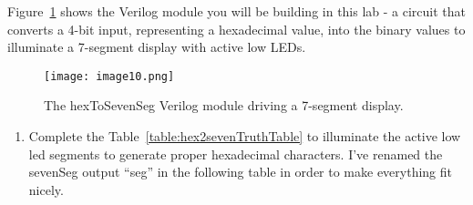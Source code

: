 Figure~\ref{fig:hex2SevenSeg} shows the Verilog module you will be building in this lab - a
circuit that converts a 4-bit input, representing a hexadecimal value,
into the binary values to illuminate a 7-segment display with active low
LEDs.

\begin{figure}[ht]
\texttt{[image: image10.png]}
\caption{The hexToSevenSeg Verilog module driving a 7-segment display.}
\label{fig:hex2SevenSeg}
\end{figure}

\begin{enumerate}
\def\labelenumi{\arabic{enumi}.}
\item
  Complete the Table~\ref{table:hex2sevenTruthTable} to illuminate the active low led segments
  to generate proper hexadecimal characters. I've renamed the sevenSeg
  output ``seg'' in the following table in order to make everything fit
  nicely.
\end{enumerate}

